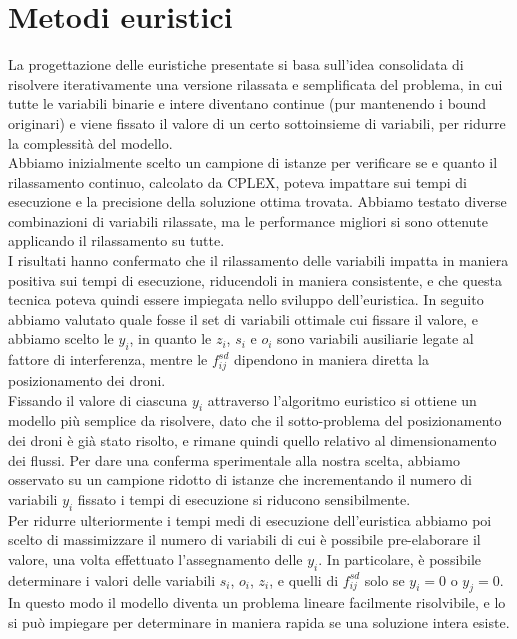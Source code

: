 \section{Metodi euristici} \label{sec:euristica}
La progettazione delle euristiche presentate si basa sull'idea consolidata di risolvere iterativamente una versione rilassata e semplificata del problema, in cui tutte le variabili binarie e intere diventano continue (pur mantenendo i bound originari) e viene fissato il valore di un certo sottoinsieme di variabili, per ridurre la complessità del modello. \\
Abbiamo inizialmente scelto un campione di istanze per verificare se e quanto il rilassamento continuo, calcolato da CPLEX, poteva impattare sui tempi di esecuzione e la precisione della soluzione ottima trovata. 
Abbiamo testato diverse combinazioni di variabili rilassate, ma le performance migliori si sono ottenute applicando il rilassamento su tutte. \\
I risultati hanno confermato che il rilassamento delle variabili impatta in maniera positiva sui tempi di esecuzione, riducendoli in maniera consistente, e che questa tecnica poteva quindi essere impiegata nello sviluppo dell'euristica.
In seguito abbiamo valutato quale fosse il set di variabili ottimale cui fissare il valore, e abbiamo scelto le $y_i$, in quanto le $z_i$, $s_i$ e $o_i$ sono variabili ausiliarie legate al fattore di interferenza, mentre le $f_{ij}^{sd}$ dipendono in maniera diretta la posizionamento dei droni. \\
Fissando il valore di ciascuna $y_i$ attraverso l'algoritmo euristico si ottiene un modello più semplice da risolvere, dato che il sotto-problema del posizionamento dei droni è già stato risolto, e rimane quindi quello relativo al dimensionamento dei flussi. 
Per dare una conferma sperimentale alla nostra scelta, abbiamo osservato su un campione ridotto di istanze che incrementando il numero di variabili $y_i$ fissato i tempi di esecuzione si riducono sensibilmente. \\
Per ridurre ulteriormente i tempi medi di esecuzione dell'euristica abbiamo poi scelto di massimizzare il numero di variabili di cui è possibile pre-elaborare il valore, una volta effettuato l'assegnamento delle $y_i$. In particolare, è possibile determinare i valori delle variabili $s_i$, $o_i$, $z_i$, e quelli di $f_{ij}^{sd}$ solo se $y_i = 0$ o $y_j = 0$. In questo modo il modello diventa un problema lineare facilmente risolvibile, e lo si può impiegare per determinare in maniera rapida se una soluzione intera esiste.\\
